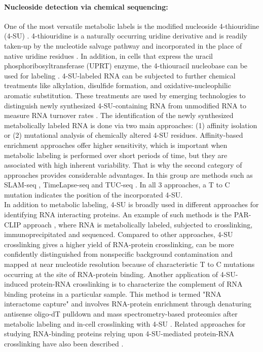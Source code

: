 \paragraph{Nucleoside detection via chemical sequencing:}

One of the most versatile metabolic labels is the modified nucleoside 4-thiouridine (4-SU) \citep{Kleiner2021}. 4-thiouridine is a naturally occurring uridine derivative and is readily taken-up by the nucleotide salvage pathway and  incorporated in the place of native uridine residues \citep{Parish1968,Melvin1978}. In addition, in cells that express the uracil phosphoribosyltransferase (UPRT) enzyme, the 4-thiouracil nucleobase can be used for labeling \citep{Cleary2005}. 4-SU-labeled RNA can be subjected to further chemical treatments like alkylation, disulfide formation, and oxidative-nucleophilic aromatic substitution. These treatments are used by emerging technologies to distinguish newly synthesized 4-SU-containing RNA from unmodified RNA to measure RNA turnover rates \citep{Herzog2017,Riml2017,Schofield2018,Fuchs2014,Schwalb2016,Rabani2011}. The identification of the newly synthesized metabolically labeled RNA is done via two main approaches: (1) affinity isolation or (2) mutational analysis of chemically altered 4-SU residues.  Affinity-based enrichment approaches offer higher sensitivity, which is important when metabolic labeling is performed over short periods of time, but they are associated with high inherent variability. That is why the second category of approaches provides considerable advantages. In this group are methods such as SLAM-seq \citep{Herzog2017}, TimeLapse-seq \citep{Schofield2018} and TUC-seq \citep{Riml2017}. In all 3 approaches, a T to C mutation indicates the position of the incorporated 4-SU. \\
In addition to metabolic labeling, 4-SU is broadly used in different approaches for identifying RNA interacting proteins. An example of such methods is the PAR-CLIP approach \citep{Hafner2010}, where RNA is metabolically labeled,  subjected to crosslinking, immunoprecipitated and sequenced. Compared to other approaches, 4-SU crosslinking gives a higher yield of RNA-protein crosslinking, can be more confidently distinguished from nonspecific background contamination and mapped at near nucleotide resolution because of characteristic T to C mutations occurring at the site of RNA-protein binding. Another application of 4-SU-induced protein-RNA crosslinking is to characterize the complement of RNA binding proteins in a particular sample. This method is termed "RNA interactome capture" and involves RNA-protein enrichment through denaturing antisense oligo-dT pulldown and mass spectrometry-based proteomics after metabolic labeling and in-cell crosslinking with 4-SU \citep{Castello2012}. Related approaches for studying RNA-binding proteins relying upon 4-SU-mediated protein-RNA crosslinking have also been described \citep{He2016,Shchepachev2019,Huang2018,Trendel2019,Queiroz2019}.
